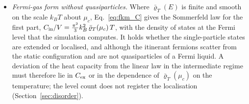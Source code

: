 \documentclass[10pt,a4paper]{article}
\theoremstyle{plain}
\begin{document}
\begin{itemize}
  evaluated.
\item \emph{Fermi-gas form without quasiparticles.} Where
  $\bar\varrho_T(E)$ is finite and smooth on the scale $k_BT$ about $\mu_c$,
  Eq.~\eqref{eq:fkm_C} gives the Sommerfeld law for the first part,
  $C_{\rm in}/V=\tfrac{\pi^{2}}{3}k_B^{2}\,\bar\varrho_T(\mu_c)\,T$, with the
  density of states at the Fermi level that the simulation computes. It
  holds whether the single-particle states are extended or localised, and
  although the itinerant fermions scatter from the static configuration and
  are not quasiparticles of a Fermi liquid. A deviation of the heat capacity
  from the linear law in the intermediate regime must therefore lie in
  $C_{\rm ex}$ or in the dependence of $\bar\varrho_T(\mu_c)$ on the
  temperature; the level count does not register the localisation
  (Section~\ref{sec:disorder}).
\end{itemize}
\end{document}
